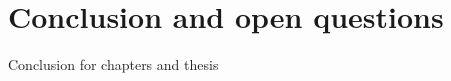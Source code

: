 \chapter{Conclusion and open questions}\label{ch:Conclusion}

Conclusion for chapters and thesis




